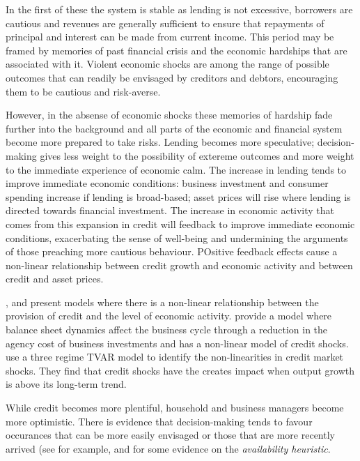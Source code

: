 \documentclass[12pt, a4paper, oneside]{article} %
\begin{document}
In the first of these the system is stable as lending is not excessive, borrowers are cautious and revenues are generally sufficient to ensure that repayments of principal and interest can be made from current income.  This period may be framed by memories of past financial crisis and the economic hardships that are associated with it.  Violent economic shocks are among the range of possible outcomes that can readily be envisaged by creditors and debtors, encouraging them to be cautious and risk-averse. 

However, in the absense of economic shocks these memories of hardship fade further into the background and all parts of the economic and financial system become more prepared to take risks.  Lending becomes more speculative; decision-making gives less weight to the possibility of extereme outcomes and more weight to the immediate experience of economic calm.  The increase in lending tends to improve immediate economic conditions:  business investment and consumer spending increase if lending is broad-based; asset prices will rise where lending is directed towards financial investment.  The increase in economic activity that comes from this expansion in credit will feedback to improve immediate economic conditions, exacerbating the sense of well-being and undermining the arguments of those preaching more cautious behaviour.  POsitive feedback effects cause a non-linear relationship between credit growth and economic activity and between credit and asset prices. 

\citet{Bernanke1999chapter}, \citet{BernankeGertler} and \citet{Azaraidis} present models where there is a non-linear relationship between  the provision of credit and the level of economic activity. \citet{BernankeGertlerAgency} provide a model where balance sheet dynamics affect the business cycle through a reduction in the agency cost of business investments and \citet{Balke} has a non-linear model of credit shocks.  \citet{Avdjiev2014} use a three regime TVAR model to identify the non-linearities in credit market shocks.  They find that credit shocks have the creates impact when output growth is above its long-term trend. 

While credit becomes more plentiful, household and business managers become more optimistic.  There is evidence that decision-making tends to favour occurances that can be more easily envisaged or those that are more recently arrived (see for example, \citet{KTAvailability} and \citet{Schwartzavailability} for some evidence on the \emph{availability heuristic}.   %
\end{document}

